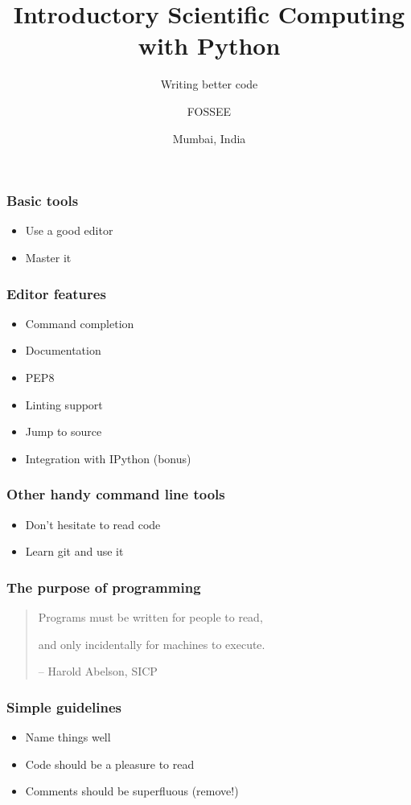 \documentclass[14pt,compress]{beamer}
\title[Better code]{Introductory Scientific Computing with
Python}
\subtitle{Writing better code}
\author{FOSSEE}
\institute[FOSSEE -- IITB] {Department of Aerospace Engineering\\IIT Bombay}
\date[] {
Mumbai, India
}
\begin{document}
\begin{frame}
  \maketitle
\end{frame}

\begin{frame}
  \frametitle{Basic tools}
  \begin{itemize}
  \item Use a good editor
  \item Master it
  \end{itemize}
\end{frame}

\begin{frame}
  \frametitle{Editor features}
  \begin{itemize}
  \item Command completion
  \item Documentation
  \item PEP8
  \item Linting support
  \item Jump to source
  \item Integration with IPython (bonus)
  \end{itemize}
\end{frame}

\begin{frame}
  \frametitle{Other handy command line tools}
  \begin{itemize}
  \item Don't hesitate to read code
  \item Learn git and use it
  \end{itemize}
\end{frame}

\begin{frame}
  \frametitle{The purpose of programming}
  \Large
  \begin{quote}
    Programs must be written for people to read,

    \vspace*{0.5in}
    \pause
    and only incidentally for machines to execute.

    \hfill -- Harold Abelson, SICP
  \end{quote}
\end{frame}

\begin{frame}
  \frametitle{Simple guidelines}
  \begin{itemize}
  \item Name things well
  \item Code should be a pleasure to read
  \item Comments should be superfluous (remove!)
  \end{itemize}
\end{frame}
\end{document}
